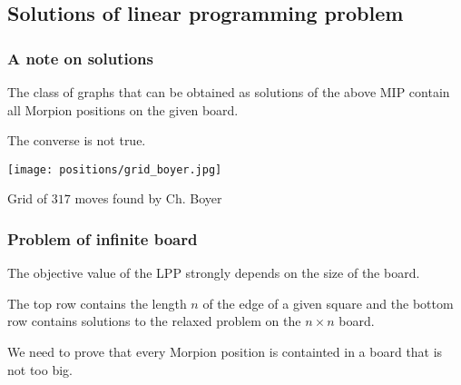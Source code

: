 \documentclass[pdftex]{beamer}
\begin{document}
\subsection{Solutions of linear programming problem}
\begin{frame}
\frametitle{A note on solutions}

The class of graphs that can be obtained as solutions of the above MIP contain all Morpion positions on the given board.

The converse is not true.

\begin{center}
  \texttt{[image: positions/grid\_boyer.jpg]}

  \begin{flushright}
  {\tiny Grid of $317$ moves found by Ch. Boyer}
  \end{flushright}
\end{center}


\end{frame}

\begin{frame}
\frametitle{Problem of infinite board}

The objective value of the LPP strongly depends on the size of the board.

\vspace{3mm}
\begin{center}
\end{center}

\vspace{3mm}
{\footnotesize
The top row contains the length $n$ of the edge of a given square and the bottom row contains solutions to the relaxed problem on the $n\times n$ board.}

\vspace{3mm}
We need to prove that every Morpion position is containted in a board that is not too big.

\end{frame}

%
%
\end{document}
